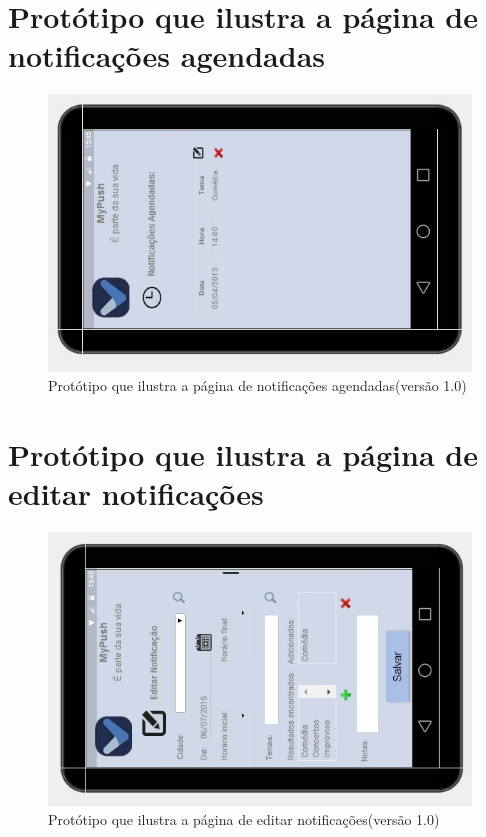 \begin{apendicesenv}
    \pagebreak
      \section*{Protótipo que ilustra a página de notificações agendadas}

    \begin{figure}[!htbp]
      \centering
      \includegraphics[scale=0.9, angle=-90]{editaveis/figuras/prototipo_alta_fidelidade_v1/1_7}
      \caption{Protótipo que ilustra a página de notificações agendadas(versão 1.0)}
      \label{v1}
    \end{figure}
    
    \pagebreak
      \section*{Protótipo que ilustra a página de editar notificações}

    \begin{figure}[!htbp]
      \centering
      \includegraphics[scale=0.9, angle=-90]{editaveis/figuras/prototipo_alta_fidelidade_v1/1_8}
      \caption{Protótipo que ilustra a página de editar notificações(versão 1.0)}
      \label{v1}
    \end{figure}
    

\end{apendicesenv}
